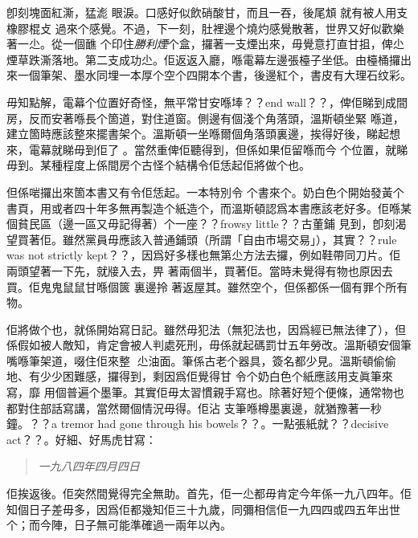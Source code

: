 卽刻塊面紅澌，猛滮
%
眼淚。口感好似飲硝酸甘，而且一吞，後尾䪴
%
就有被人用支橡膠棍攴
%
過來个感覺。不過，下一刻，肚裡邊个燒灼感覺散著，世界又好似歡樂著一尐。從一個䩌
%
个印住\emph{勝利煙}个盒，攞著一支煙出來，毋覺意打直甘抯，俾尐煙草跌澌落地。第二支成功尐。佢返返入廳，喺電幕左邊張檯子坐低。由檯桶攞出來一個筆架、墨水同埋一本厚个空个四開本个書，後邊紅个，書皮有大理石纹彩。

毋知點解，電幕个位置好奇怪，無平常甘安喺埲？？end wall？？，俾佢睇到成間房，反而安著喺長个箇道，對住道窗。側邊有個淺个角落頭，溫斯頓坐緊
%
喺道，建立箇時應該整來擺書架个。溫斯頓一坐喺爾個角落頭裏邊，挨得好後，睇起想來，電幕就睇毋到佢了
%
。當然重俾佢聽得到，但係如果佢留喺而今
%
个位置，就睇毋到。某種程度上係間房个古怪个結構令佢恁起佢將做个也。

但係啱攞出來箇本書又有令佢恁起。一本特別令
%
个書來个。奶白色个開始發黃个書頁，用或者四十年多無再製造个紙造个，而溫斯頓認爲本書應該老好多。佢喺某個貧民區（邊一區又毋記得著）个一座？？frowsy little？？古董鋪
%
見到，卽刻渴望買著佢。雖然黨員毋應該入普通鋪頭（所謂「自由市場交易」），其實？？rule was not strictly kept？？，因爲好多樣也無第尐方法去攞，例如鞋帶同刀片。佢兩頭望著一下先，就𤗈入去，畀
%
著兩個半，買著佢。當時未覺得有物也原因去買。佢鬼鬼鼠鼠甘喺個篋
%
裏邊拎
%
著返屋其。雖然空个，但係都係一個有罪个所有物。

佢將做个也，就係開始寫日記。雖然毋犯法（無犯法也，因爲經已無法律了），但係假如被人敵知，肯定會被人判處死刑，毋係就起碼罰廿五年勞改。溫斯頓安個筆嘴喺筆架道，啜住佢來整𠞉
%
尐油面。筆係古老个器具，簽名都少見。溫斯頓偷偷地、有少少困難感，攞得到，剩因爲佢覺得甘
%
令个奶白色个紙應該用支眞筆來寫，靡
%
用個普遍个墨筆。其實佢毋太習慣親手寫也。除著好短个便條，通常物也都對住部話寫講，當然爾個情況毋得。佢沾
%
支筆喺樽墨裏邊，就猶豫著一秒鐘。？？a tremor had gone through his bowels？？。一點張紙就？？decisive act？？。好細、好馬虎甘寫：
\begin{quote}\emph{
一九八四年四月四日
}\end{quote}%
佢挨返後。佢突然間覺得完全無助。首先，佢一尐都毋肯定今年係一九八四年。佢知個日子差毋多，因爲佢都幾知佢三十九歲，同彌相信佢一九四四或四五年出世个；而今陣，日子無可能準確過一兩年以內。

